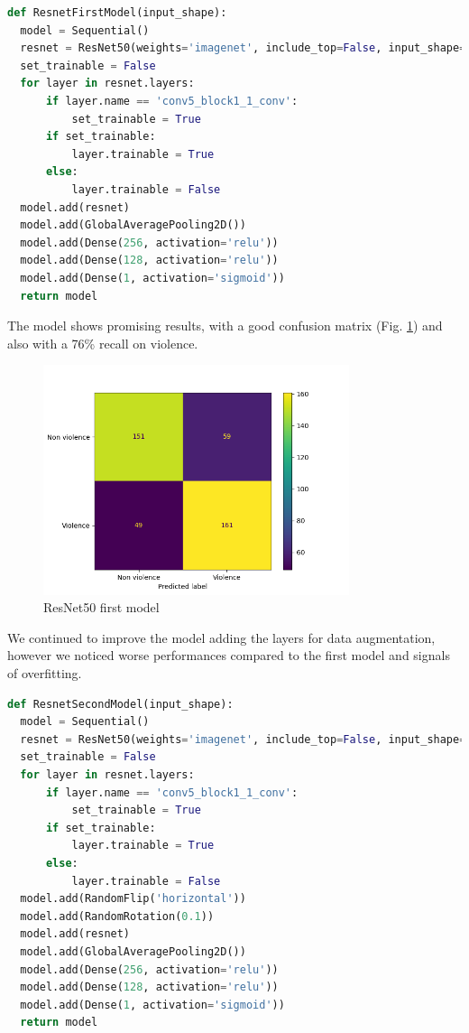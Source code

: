 \begin{lstlisting}[language=python, caption={ResNet50, first model}, label={lst:resnet50Code}]
def ResnetFirstModel(input_shape):
  model = Sequential()
  resnet = ResNet50(weights='imagenet', include_top=False, input_shape=input_shape)
  set_trainable = False
  for layer in resnet.layers:
      if layer.name == 'conv5_block1_1_conv':
          set_trainable = True
      if set_trainable:
          layer.trainable = True
      else:
          layer.trainable = False
  model.add(resnet)
  model.add(GlobalAveragePooling2D())
  model.add(Dense(256, activation='relu'))
  model.add(Dense(128, activation='relu'))
  model.add(Dense(1, activation='sigmoid'))
  return model
\end{lstlisting}

The model shows promising results, with a good confusion matrix (Fig. \ref{fig:ResNet2d1}) and also with a 76\% recall on violence.

\begin{figure}[H]
    \centering
    \includegraphics[width=0.8\textwidth]{images/731a-resnet2D1-86ad-conf_matrix.png}
    \caption{ResNet50 first model}
    \label{fig:ResNet2d1}
\end{figure}

We continued to improve the model adding the layers for data augmentation, however we noticed worse performances compared to the first model and signals of overfitting. 
\begin{lstlisting}[language=python, caption={ResNet50, second model code}, label={lst:resnet50CodeSecondTest}]
def ResnetSecondModel(input_shape):
  model = Sequential()
  resnet = ResNet50(weights='imagenet', include_top=False, input_shape=input_shape)
  set_trainable = False
  for layer in resnet.layers:
      if layer.name == 'conv5_block1_1_conv':
          set_trainable = True
      if set_trainable:
          layer.trainable = True
      else:
          layer.trainable = False
  model.add(RandomFlip('horizontal'))
  model.add(RandomRotation(0.1))
  model.add(resnet)
  model.add(GlobalAveragePooling2D())
  model.add(Dense(256, activation='relu'))
  model.add(Dense(128, activation='relu'))
  model.add(Dense(1, activation='sigmoid'))
  return model
\end{lstlisting}

